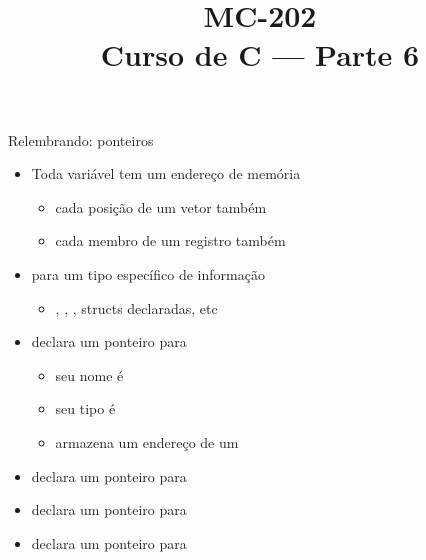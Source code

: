 \documentclass{beamer}
\title{MC-202\\
Curso de C --- Parte 6}
\begin{document}
\begin{frame}[plain]
  \titlepage
\end{frame}

\begin{frame}[<+->]{Relembrando: ponteiros}

  \begin{itemize}
    \item Toda variável tem um \alert{endereço de memória}
      \begin{itemize}
        \item cada posição de um vetor também
        \item cada membro de um registro também
      \end{itemize}
  \end{itemize}

  \bigskip
  \begin{itemize}
    \item para um tipo específico de informação
      \begin{itemize}
        \item {}, , , structs declaradas, etc
      \end{itemize}
  \end{itemize}

  \bigskip
  \begin{itemize}
    \item {} declara um ponteiro para \alert{}
      \begin{itemize}
        \item seu nome é 
        \item seu tipo é 
        \item armazena um endereço de um 
      \end{itemize}
    \item {} declara um ponteiro para 
    \item {} declara um ponteiro para 
    \item {} declara um ponteiro para 
  \end{itemize}
\end{frame}
\end{document}
